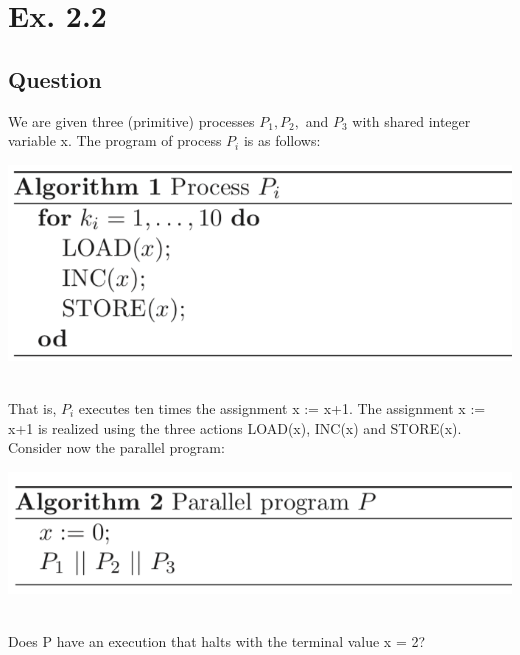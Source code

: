 \documentclass[12pt]{article}
\begin{document}
\newpage

\section*{Ex. 2.2}
\subsection*{Question}
We are given three (primitive) processes $P_1, P_2,$ and $P_3$ with shared integer variable x. The program of process $P_i$ is as follows:\\
\begin{centering}
	\includegraphics*[scale=0.5]{algo1.png}
\end{centering}
\\
That is, $P_i$ executes ten times the assignment x := x+1. The assignment x := x+1 is realized using the three actions LOAD(x), INC(x) and STORE(x). Consider now the parallel program:\\
\begin{centering}
	\includegraphics*[scale=0.5]{algo2.png}
\end{centering}
\\
Does P have an execution that halts with the terminal value x = 2?
\end{document}
